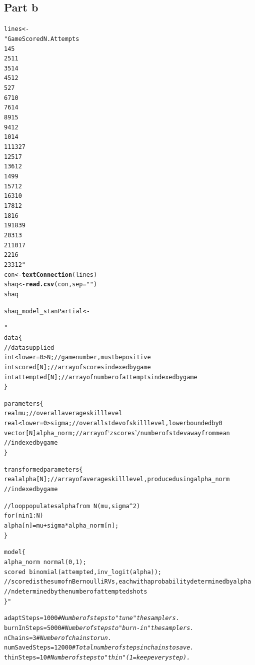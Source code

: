 \documentclass{article}\usepackage[]{graphicx}\usepackage[]{color}
\makeatletter
\newcommand{\hlnum}[1]{\textcolor[rgb]{0.686,0.059,0.569}{#1}}%
\newcommand{\hlstr}[1]{\textcolor[rgb]{0.192,0.494,0.8}{#1}}%
\newcommand{\hlcom}[1]{\textcolor[rgb]{0.678,0.584,0.686}{\textit{#1}}}%
\newcommand{\hlstd}[1]{\textcolor[rgb]{0.345,0.345,0.345}{#1}}%
\newcommand{\hlkwb}[1]{\textcolor[rgb]{0.69,0.353,0.396}{#1}}%
\newcommand{\hlkwc}[1]{\textcolor[rgb]{0.333,0.667,0.333}{#1}}%
\newcommand{\hlkwd}[1]{\textcolor[rgb]{0.737,0.353,0.396}{\textbf{#1}}}%
\newenvironment{kframe}{%
 \def\at@end@of@kframe{}%
 \ifinner\ifhmode%
  \def\at@end@of@kframe{\end{minipage}}%
  \begin{minipage}{\columnwidth}%
 \fi\fi%
 \def\FrameCommand##1{\hskip\@totalleftmargin \hskip-\fboxsep
 \colorbox{shadecolor}{##1}\hskip-\fboxsep
     \hskip-\linewidth \hskip-\@totalleftmargin \hskip\columnwidth}%
 \MakeFramed {\advance\hsize-\width
   \@totalleftmargin\z@ \linewidth\hsize
   \@setminipage}}%
 {\par\unskip\endMakeFramed%
 \at@end@of@kframe}
\newenvironment{knitrout}{}{} %
\makeatother
\begin{document}
\subsection*{Part b}
\begin{knitrout}
\color{fgcolor}\begin{kframe}
\begin{alltt}
\hlstd{lines} \hlkwb{<-}
\hlstr{"Game   Scored  N.Attempts
1   4   5
2   5   11
3   5   14
4   5   12
5   2   7
6   7   10
7   6   14
8   9   15
9   4   12
10  1   4
11  13  27
12  5   17
13  6   12
14  9   9
15  7   12
16  3   10
17  8   12
18  1   6
19  18  39
20  3   13
21  10  17
22  1   6
23  3   12"}
\hlstd{con} \hlkwb{<-} \hlkwd{textConnection}\hlstd{(lines)}
\hlstd{shaq} \hlkwb{<-} \hlkwd{read.csv}\hlstd{(con,} \hlkwc{sep}\hlstd{=}\hlstr{""}\hlstd{)}
\hlstd{shaq}

\hlstd{shaq_model_stanPartial} \hlkwb{<-} \hlstr{"
data\{
  // data supplied
  int<lower=0> N; // game number, must be positive
  int scored[N]; // array of scores indexed by game
  int attempted[N]; // array of number of attempts indexed by game
\}

parameters\{
  real mu; // overall average skill level
  real<lower=0> sigma; // overall stdev of skill level, lower bounded by 0
  vector[N] alpha_norm; // array of `zscores' / number of stdev away from mean
                        // indexed by game
\}

transformed parameters\{
  real alpha[N]; // array of average skill level, produced using alpha_norm
                 // indexed by game

  // loop populates alpha from ~N(mu, sigma^2)
  for(n in 1:N)
    alpha[n] = mu + sigma * alpha_norm[n];
\}

model\{
  alpha_norm ~ normal(0, 1);
  scored ~ binomial(attempted, inv_logit(alpha));
  // scored is the sum of n Bernoulli RVs, each with a probability determined by alpha
  // n determined by the number of attempted shots
\}"}

\hlstd{adaptSteps} \hlkwb{=} \hlnum{1000}            \hlcom{# Number of steps to "tune" the samplers.}
\hlstd{burnInSteps} \hlkwb{=} \hlnum{5000}           \hlcom{# Number of steps to "burn-in" the samplers.}
\hlstd{nChains} \hlkwb{=} \hlnum{3}                  \hlcom{# Number of chains to run.}
\hlstd{numSavedSteps}\hlkwb{=}\hlnum{12000}          \hlcom{# Total number of steps in chains to save.}
\hlstd{thinSteps}\hlkwb{=}\hlnum{10}                 \hlcom{# Number of steps to "thin" (1=keep every step).}


\end{alltt}
\end{kframe}
\end{knitrout}
\end{document}
